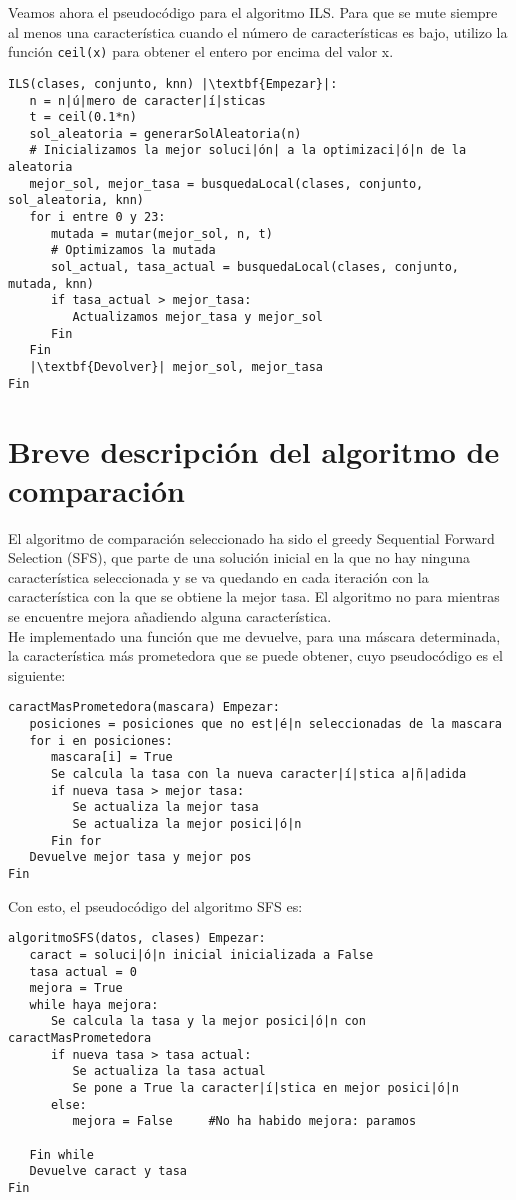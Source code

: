 \documentclass[12pt]{article}
\begin{document}
Veamos ahora el pseudocódigo para el algoritmo ILS. Para que se mute siempre al menos una característica cuando el número de características es bajo, utilizo la función \texttt{ceil(x)} para obtener el entero por encima del valor x.
\begin{lstlisting}
ILS(clases, conjunto, knn) |\textbf{Empezar}|:
   n = n|ú|mero de caracter|í|sticas
   t = ceil(0.1*n)
   sol_aleatoria = generarSolAleatoria(n)
   # Inicializamos la mejor soluci|ón| a la optimizaci|ó|n de la aleatoria 
   mejor_sol, mejor_tasa = busquedaLocal(clases, conjunto, sol_aleatoria, knn)
   for i entre 0 y 23:
      mutada = mutar(mejor_sol, n, t)
      # Optimizamos la mutada
      sol_actual, tasa_actual = busquedaLocal(clases, conjunto, mutada, knn)
      if tasa_actual > mejor_tasa:
         Actualizamos mejor_tasa y mejor_sol
      Fin
   Fin
   |\textbf{Devolver}| mejor_sol, mejor_tasa
Fin

\end{lstlisting}

\newpage

\section{Breve descripción del algoritmo de comparación}
El algoritmo de comparación seleccionado ha sido el greedy Sequential Forward Selection (SFS), que parte de una solución inicial en la que no hay ninguna característica seleccionada y se va quedando en cada iteración con la característica con la que se obtiene la mejor tasa. El algoritmo no para mientras se encuentre mejora añadiendo alguna característica.\\
He implementado una función que me devuelve, para una máscara determinada, la característica más prometedora que se puede obtener, cuyo pseudocódigo es el siguiente:
\begin{lstlisting}
caractMasPrometedora(mascara) Empezar:
   posiciones = posiciones que no est|é|n seleccionadas de la mascara
   for i en posiciones:
      mascara[i] = True
      Se calcula la tasa con la nueva caracter|í|stica a|ñ|adida
      if nueva tasa > mejor tasa:
         Se actualiza la mejor tasa
         Se actualiza la mejor posici|ó|n
      Fin for
   Devuelve mejor tasa y mejor pos
Fin
\end{lstlisting}

Con esto, el pseudocódigo del algoritmo SFS es:
\begin{lstlisting}
algoritmoSFS(datos, clases) Empezar:
   caract = soluci|ó|n inicial inicializada a False
   tasa actual = 0
   mejora = True
   while haya mejora:
      Se calcula la tasa y la mejor posici|ó|n con caractMasPrometedora
      if nueva tasa > tasa actual:
         Se actualiza la tasa actual
         Se pone a True la caracter|í|stica en mejor posici|ó|n
      else:
         mejora = False		#No ha habido mejora: paramos
      
   Fin while
   Devuelve caract y tasa
Fin

\end{lstlisting}
\end{document}
